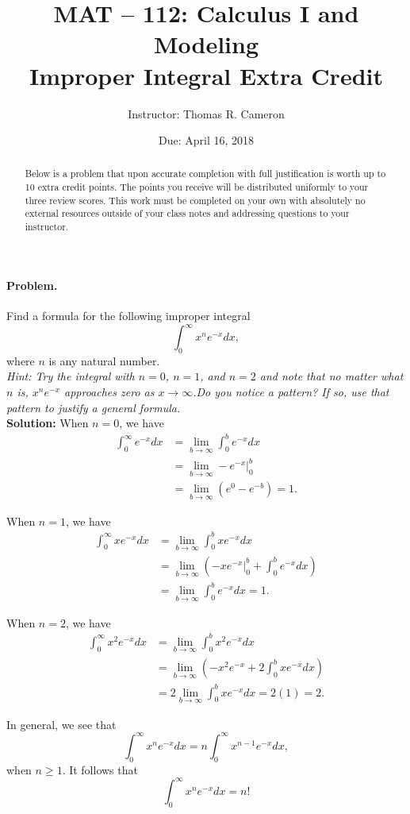 \documentclass{article}
\title{MAT -- 112: Calculus I and Modeling\\
\large{Improper Integral Extra Credit}}
\author{Instructor: Thomas R. Cameron}
\date{Due: April 16, 2018}
\begin{document}
\maketitle

\begin{abstract}
Below is a problem that upon accurate completion with full justification is worth up to 10 extra credit points. The points you receive will be distributed uniformly to your three review scores. This work must be completed on your own with absolutely no external resources outside of your class notes and addressing questions to your instructor. 
\end{abstract}

\paragraph*{Problem.} Find a formula for the following improper integral
\[
\int_{0}^{\infty}x^{n}e^{-x}dx,
\]
where $n$ is any natural number. ~\\
\emph{Hint: Try the integral with $n=0$, $n=1$, and $n=2$ and note that no matter what $n$ is, $x^{n}e^{-x}$ approaches zero as $x\rightarrow\infty$.Do you notice a pattern? If so, use that pattern to justify a general formula.}
~\\
\textbf{Solution:} When $n=0$, we have
\begin{align*}
\int_{0}^{\infty}e^{-x}dx &= \lim_{b\rightarrow\infty}\int_{0}^{b}e^{-x}dx\\
&=\lim_{b\rightarrow\infty}-e^{-x}|_{0}^{b} \\
&=\lim_{b\rightarrow\infty}\left(e^{0}-e^{-b}\right) = 1.
\end{align*}

When $n=1$, we have
\begin{align*}
\int_{0}^{\infty}xe^{-x}dx &= \lim_{b\rightarrow\infty}\int_{0}^{b}xe^{-x}dx \\
&= \lim_{b\rightarrow\infty}\left(-xe^{-x}|_{0}^{b}+\int_{0}^{b}e^{-x}dx\right) \\
&= \lim_{b\rightarrow\infty}\int_{0}^{b}e^{-x}dx = 1.
\end{align*}

When $n=2$, we have
\begin{align*}
\int_{0}^{\infty}x^{2}e^{-x}dx &= \lim_{b\rightarrow\infty}\int_{0}^{b}x^{2}e^{-x}dx \\
&= \lim_{b\rightarrow\infty}\left(-x^{2}e^{-x}+2\int_{0}^{b}xe^{-x}dx\right) \\
&= 2\lim_{b\rightarrow\infty}\int_{0}^{b}xe^{-x}dx = 2(1)=2.
\end{align*}

In general, we see that
\[
\int_{0}^{\infty}x^{n}e^{-x}dx=n\int_{0}^{\infty}x^{n-1}e^{-x}dx,
\]
when $n\geq 1$. It follows that 
\[
\int_{0}^{\infty}x^{n}e^{-x}dx=n!
\]
\end{document}
